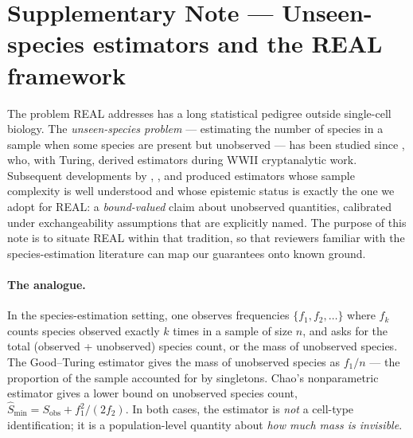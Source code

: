 %
%

\section*{Supplementary Note --- Unseen-species estimators and the REAL framework}
\label{sec:supp-unseen-species}

The problem REAL addresses has a long statistical pedigree outside single-cell biology. The \emph{unseen-species problem} --- estimating the number of species in a sample when some species are present but unobserved --- has been studied since \citet{good1953population}, who, with Turing, derived estimators during WWII cryptanalytic work. Subsequent developments by \citet{chao1984nonparametric}, \citet{bunge1993species}, \citet{orlitsky2016optimal} and \citet{valiant2011estimating} produced estimators whose sample complexity is well understood and whose epistemic status is exactly the one we adopt for REAL: a \emph{bound-valued} claim about unobserved quantities, calibrated under exchangeability assumptions that are explicitly named. The purpose of this note is to situate REAL within that tradition, so that reviewers familiar with the species-estimation literature can map our guarantees onto known ground.

\paragraph*{The analogue.}
In the species-estimation setting, one observes frequencies $\{f_{1}, f_{2}, \dots\}$ where $f_{k}$ counts species observed exactly $k$ times in a sample of size $n$, and asks for the total (observed + unobserved) species count, or the mass of unobserved species. The Good--Turing estimator gives the mass of unobserved species as $f_{1}/n$ --- the proportion of the sample accounted for by singletons. Chao's nonparametric estimator gives a lower bound on unobserved species count, $\hat{S}_{\min} = S_{\text{obs}} + f_{1}^{2}/(2 f_{2})$. In both cases, the estimator is \emph{not} a cell-type identification; it is a population-level quantity about \emph{how much mass is invisible}.

